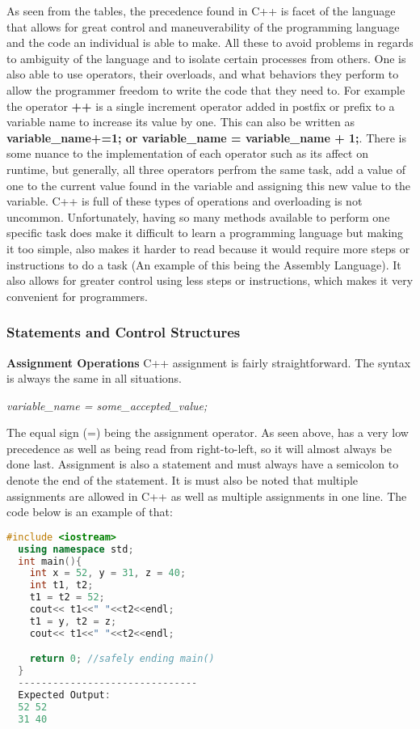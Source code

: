 \documentclass[12pt]{article}
\begin{document}
As seen from the tables, the precedence found in C++ is facet of the language that allows for great control and maneuverability of the programming language and the code an individual is able to make. All these to avoid problems in regards to ambiguity of the language and to isolate certain processes from others. One is also able to use operators, their overloads, and what behaviors they perform to allow the programmer freedom to write the code that they need to. For example the operator \textbf{++} is a single increment operator added in postfix or prefix to a variable name to increase its value by one. This can also be written as \textbf{variable\_name+=1; or variable\_name = variable\_name + 1;}. There is some nuance to the implementation of each operator such as its affect on runtime, but generally, all three operators perfrom the same task, add a value of one to the current value found in the variable and assigning this new value to the variable. C++ is full of these types of operations and overloading is not uncommon. Unfortunately, having so many methods available to perform one specific task does make it difficult to learn a programming language but making it too simple, also makes it harder to read because it would require more steps or instructions to do a task (An example of this being the Assembly Language). It also allows for greater control using less steps or instructions, which makes it very convenient for programmers.

\subsubsection{Statements and Control Structures}

\textbf{Assignment Operations} C++ assignment is fairly straightforward. The syntax is always the same in all situations.
\begin{center}
  \textit{variable\_name = some\_accepted\_value;}
\end{center}
The equal sign (=) being the assignment operator. As seen above, has a very low precedence as well as being read from right-to-left, so it will almost always be done last. Assignment is also a statement and must always have a semicolon to denote the end of the statement. It is must also be noted that multiple assignments are allowed in C++ as well as multiple assignments in one line. The code below is an example of that:
\begin{lstlisting}[language=C++]
  #include <iostream>
  using namespace std;
  int main(){
    int x = 52, y = 31, z = 40;
    int t1, t2;
    t1 = t2 = 52;
    cout<< t1<<" "<<t2<<endl;
    t1 = y, t2 = z;
    cout<< t1<<" "<<t2<<endl;

    return 0; //safely ending main()
  }
  -------------------------------
  Expected Output:
  52 52
  31 40
\end{lstlisting}
\end{document}
